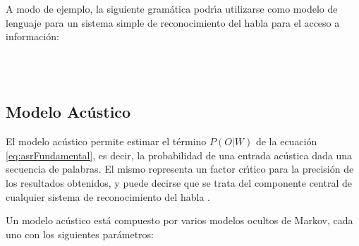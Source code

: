 A modo de ejemplo, la siguiente gram\'atica podr{\'\i}a utilizarse como modelo de lenguaje para un sistema simple
de reconocimiento del habla para el acceso a informaci\'on:

\begin{bnf*}
{ \bnfsp {} \bnfsp {}  \bnfsp  {} \bnfsp {}} \\
{ \bnfor {} \bnfor {}} \\
{ \bnfor {} \bnfor {}}
\end{bnf*}

\subsection{Modelo Ac\'ustico}
El modelo ac\'ustico permite estimar el t\'ermino $P(O|W)$ de la ecuaci\'on \ref{eq:asrFundamental}, es decir,
la probabilidad de una entrada ac\'ustica dada una secuencia de palabras.
El mismo representa un factor cr{\'\i}tico para la precisi\'on de los resultados obtenidos, y puede decirse que
se trata del componente central de cualquier sistema de reconocimiento del habla \cite{huang-handbook10}.

Un modelo ac\'ustico est\'a compuesto por varios modelos ocultos de Markov, cada uno con
los siguientes par\'ametros:


